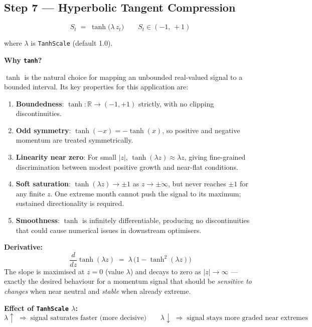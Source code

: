 \documentclass[11pt, a4paper]{article}
\begin{document}
\subsection{Step 7 — Hyperbolic Tangent Compression}
\label{sec:step7}

\begin{equation}
  \boxed{S_t \;=\; \tanh\!\bigl(\lambda\,z_t\bigr)}
  \qquad S_t \in (-1,\,+1)
\end{equation}

where $\lambda$ is \texttt{TanhScale} (default 1.0).

\textbf{Why \texttt{tanh}?}

$\tanh$ is the natural choice for mapping an unbounded real-valued
signal to a bounded interval. Its key properties for this application are:

\begin{enumerate}[leftmargin=2em]
  \item \textbf{Boundedness}: $\tanh : \mathbb{R} \to (-1,+1)$
        strictly, with no clipping discontinuities.
  \item \textbf{Odd symmetry}: $\tanh(-x) = -\tanh(x)$, so
        positive and negative momentum are treated symmetrically.
  \item \textbf{Linearity near zero}: For small $|z|$,
        $\tanh(\lambda z) \approx \lambda z$, giving fine-grained
        discrimination between modest positive growth and near-flat conditions.
  \item \textbf{Soft saturation}: $\tanh(\lambda z) \to \pm 1$ as
        $z \to \pm\infty$, but never reaches $\pm 1$ for any finite
        $z$. One extreme month cannot push the signal to its maximum;
        sustained directionality is required.
  \item \textbf{Smoothness}: $\tanh$ is infinitely differentiable,
        producing no discontinuities that could cause numerical issues
        in downstream optimisers.
\end{enumerate}

\textbf{Derivative:}
\begin{equation}
  \frac{d}{dz}\tanh(\lambda z) \;=\; \lambda\,\bigl(1 - \tanh^2(\lambda z)\bigr)
\end{equation}
The slope is maximised at $z = 0$ (value $\lambda$) and decays to
zero as $|z| \to \infty$ — exactly the desired behaviour for a
momentum signal that should be \emph{sensitive to changes} when near
neutral and \emph{stable} when already extreme.

\textbf{Effect of \texttt{TanhScale} $\lambda$:}
\begin{equation}
  \lambda \uparrow \;\Rightarrow\; \text{signal saturates faster (more decisive)}
  \qquad
  \lambda \downarrow \;\Rightarrow\; \text{signal stays more graded near extremes}
\end{equation}
\end{document}
